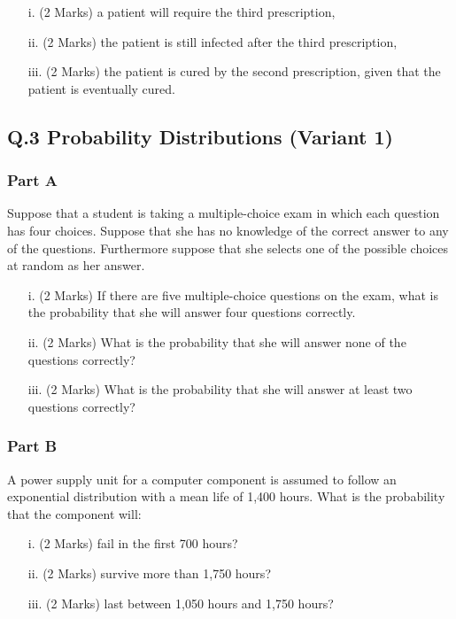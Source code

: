 \documentclass[a4paper,12pt]{article}
\begin{document}
\begin{itemize}
\item[i.](2 Marks) a patient will require the third prescription,
\item[ii.](2 Marks) the patient is still infected after the third prescription,
\item[iii.](2 Marks) the patient is cured by the second prescription, given that the patient is eventually cured.
\end{itemize}

\newpage


\subsection*{Q.3 Probability Distributions (Variant 1)}

\subsubsection*{Part A} %
Suppose that a student is taking a multiple-choice exam in which each question has four choices.
Suppose that she has no knowledge of the correct answer to any of the questions. Furthermore suppose that she selects one of the possible choices at random as her answer.
\begin{itemize}
\item [i.](2 Marks) If there are five multiple-choice questions on the exam, what is the probability that she will answer four questions correctly.
\item [ii.](2 Marks) What is the probability that she will answer none of the questions correctly?
\item [iii.](2 Marks) What is the probability that she will answer at least two questions correctly?
\end{itemize}

\subsubsection*{Part B} %
A power supply unit for a computer component is assumed to follow an exponential distribution with a mean life of 1,400 hours.  What is the probability that the component will:
\begin{itemize}
\item [i.](2 Marks)	fail in the first 700 hours?
\item [ii.](2 Marks) survive more than 1,750 hours?
\item [iii.](2 Marks) last between 1,050 hours and 1,750 hours?
\end{itemize}
\end{document}
